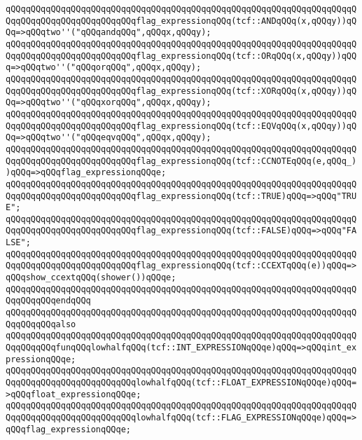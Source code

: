 \verb|qQQqqQQqqQQqqQQqqQQqqQQqqQQqqQQqqQQqqQQqqQQqqQQqqQQqqQQqqQQqqQQqqQQqqQQqqQQqqQQqqQQqqQQqqQQqqQQqflag_expressionqQQq(tcf::ANDqQQq(x,qQQqy))qQQq=>qQQqtwo''("qQQqandqQQq",qQQqx,qQQqy);|\newline
\verb|qQQqqQQqqQQqqQQqqQQqqQQqqQQqqQQqqQQqqQQqqQQqqQQqqQQqqQQqqQQqqQQqqQQqqQQqqQQqqQQqqQQqqQQqqQQqqQQqflag_expressionqQQq(tcf::ORqQQq(x,qQQqy))qQQq=>qQQqtwo''("qQQqorqQQq",qQQqx,qQQqy);|\newline
\verb|qQQqqQQqqQQqqQQqqQQqqQQqqQQqqQQqqQQqqQQqqQQqqQQqqQQqqQQqqQQqqQQqqQQqqQQqqQQqqQQqqQQqqQQqqQQqqQQqflag_expressionqQQq(tcf::XORqQQq(x,qQQqy))qQQq=>qQQqtwo''("qQQqxorqQQq",qQQqx,qQQqy);|\newline
\verb|qQQqqQQqqQQqqQQqqQQqqQQqqQQqqQQqqQQqqQQqqQQqqQQqqQQqqQQqqQQqqQQqqQQqqQQqqQQqqQQqqQQqqQQqqQQqqQQqflag_expressionqQQq(tcf::EQVqQQq(x,qQQqy))qQQq=>qQQqtwo''("qQQqeqvqQQq",qQQqx,qQQqy);|\newline
\verb|qQQqqQQqqQQqqQQqqQQqqQQqqQQqqQQqqQQqqQQqqQQqqQQqqQQqqQQqqQQqqQQqqQQqqQQqqQQqqQQqqQQqqQQqqQQqqQQqflag_expressionqQQq(tcf::CCNOTEqQQq(e,qQQq_))qQQq=>qQQqflag_expressionqQQqe;|\newline
\verb|qQQqqQQqqQQqqQQqqQQqqQQqqQQqqQQqqQQqqQQqqQQqqQQqqQQqqQQqqQQqqQQqqQQqqQQqqQQqqQQqqQQqqQQqqQQqqQQqflag_expressionqQQq(tcf::TRUE)qQQq=>qQQq"TRUE";|\newline
\verb|qQQqqQQqqQQqqQQqqQQqqQQqqQQqqQQqqQQqqQQqqQQqqQQqqQQqqQQqqQQqqQQqqQQqqQQqqQQqqQQqqQQqqQQqqQQqqQQqflag_expressionqQQq(tcf::FALSE)qQQq=>qQQq"FALSE";|\newline
\verb|qQQqqQQqqQQqqQQqqQQqqQQqqQQqqQQqqQQqqQQqqQQqqQQqqQQqqQQqqQQqqQQqqQQqqQQqqQQqqQQqqQQqqQQqqQQqqQQqflag_expressionqQQq(tcf::CCEXTqQQq(e))qQQq=>qQQqshow_ccextqQQq(shower())qQQqe;|\newline
\verb|qQQqqQQqqQQqqQQqqQQqqQQqqQQqqQQqqQQqqQQqqQQqqQQqqQQqqQQqqQQqqQQqqQQqqQQqqQQqqQQqendqQQq|\newline
\newline
\verb|qQQqqQQqqQQqqQQqqQQqqQQqqQQqqQQqqQQqqQQqqQQqqQQqqQQqqQQqqQQqqQQqqQQqqQQqqQQqqQQqalso|\newline
\verb|qQQqqQQqqQQqqQQqqQQqqQQqqQQqqQQqqQQqqQQqqQQqqQQqqQQqqQQqqQQqqQQqqQQqqQQqqQQqqQQqfunqQQqlowhalfqQQq(tcf::INT_EXPRESSIONqQQqe)qQQq=>qQQqint_expressionqQQqe;|\newline
\verb|qQQqqQQqqQQqqQQqqQQqqQQqqQQqqQQqqQQqqQQqqQQqqQQqqQQqqQQqqQQqqQQqqQQqqQQqqQQqqQQqqQQqqQQqqQQqqQQqlowhalfqQQq(tcf::FLOAT_EXPRESSIONqQQqe)qQQq=>qQQqfloat_expressionqQQqe;|\newline
\verb|qQQqqQQqqQQqqQQqqQQqqQQqqQQqqQQqqQQqqQQqqQQqqQQqqQQqqQQqqQQqqQQqqQQqqQQqqQQqqQQqqQQqqQQqqQQqqQQqlowhalfqQQq(tcf::FLAG_EXPRESSIONqQQqe)qQQq=>qQQqflag_expressionqQQqe;|\newline
